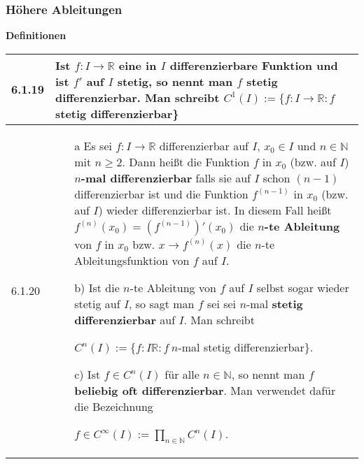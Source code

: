 \subsubsection{Höhere Ableitungen}

    \noindent
    \textbf{Definitionen}
    \begin{table}[H]  
    \begin{tabularx}{\textwidth}{X m{16cm}}
        \toprule

        6.1.19& Ist $f: I \rightarrow \mathbb{R}$ eine in $I$ differenzierbare Funktion und ist $f'$ auf $I$ stetig, so nennt man
                $f$ \textbf{stetig differenzierbar}. Man schreibt $C^1(I) := \{ f:I \rightarrow \mathbb{R}: f$ stetig differenzierbar\} \\
        \midrule
        6.1.20& \begin{itemize}
                    \item[a] Es sei $f: I \rightarrow \mathbb{R}$ differenzierbar auf $I$, $x_0 \in I$ und $n \in \mathbb{N}$ mit
                                $n \geq 2$. Dann heißt die Funktion $f$ in $x_0$ (bzw. auf $I$) \textbf{$n$-mal differenzierbar}
                                falls sie auf $I$ schon $(n-1)$ differenzierbar ist und die Funktion $f^{(n-1)}$ in $x_0$
                                (bzw. auf $I$) wieder differenzierbar ist. \hfill \break
                                In diesem Fall heißt $f^{(n)}(x_0) = (f^{(n-1)})'(x_0)$ die \textbf{$n$-te Ableitung} von $f$ in
                                $x_0$ bzw. $x \rightarrow f^{(n)}(x)$ die $n$-te Ableitungsfunktion von $f$ auf $I$. 
                    \item[b)] Ist die $n$-te Ableitung von $f$ auf $I$ selbst sogar wieder stetig auf $I$, so sagt man $f$ sei
                                sei $n$-mal \textbf{stetig differenzierbar} auf $I$. Man schreibt \hfill \break
                                \centerline{$ C^n(I) := \{ f: I \mathbb{R}: f~n$-mal stetig differenzierbar\}.}
                    \item[c)] Ist $f\in C^n(I)$ für alle $n \in \mathbb{N}$, so nennt man $f$ \textbf{beliebig oft differenzierbar}.
                                Man verwendet dafür die Bezeichnung \hfill \break
                                \centerline{$f \in C^{\infty}(I) := \prod_{n \in \mathbb{N}} C^n(I)$.}
                \end{itemize} \\

        \bottomrule

    \end{tabularx}
    \end{table}

